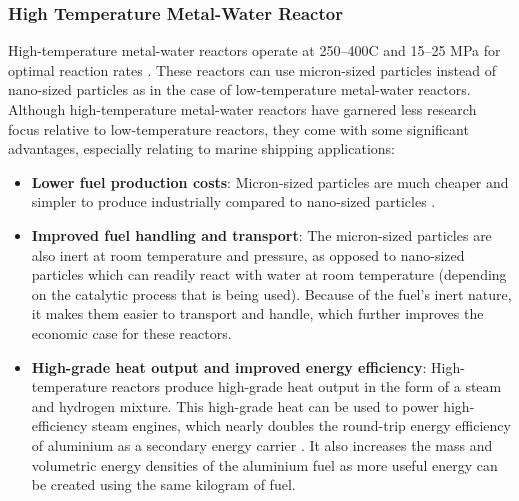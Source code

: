 \documentclass[12pt]{article}
\begin{document}
\subsubsection{High Temperature Metal-Water Reactor}

High-temperature metal-water reactors operate at 250--400\textdegree C and 15--25 MPa for optimal reaction rates \cite{high-temp-Al-H2O}. These reactors can use micron-sized particles instead of nano-sized particles as in the case of low-temperature metal-water reactors. Although high-temperature metal-water reactors have garnered less research focus relative to low-temperature reactors, they come with some significant advantages, especially relating to marine shipping applications:

\begin{itemize}
    \item \textbf{Lower fuel production costs}: Micron-sized particles are much cheaper and simpler to produce industrially compared to nano-sized particles \cite{high-temp-Al-H2O, Al-steam, metal-water-temp-JMB}.
    
    \item \textbf{Improved fuel handling and transport}: The micron-sized particles are also inert at room temperature and pressure, as opposed to nano-sized particles which can readily react with water at room temperature (depending on the catalytic process that is being used). Because of the fuel's inert nature, it makes them easier to transport and handle, which further improves the economic case for these reactors.
    
    \item \textbf{High-grade heat output and improved energy efficiency}: High-temperature reactors produce high-grade heat output in the form of a steam and hydrogen mixture. This high-grade heat can be used to power high-efficiency steam engines, which nearly doubles the round-trip energy efficiency of aluminium as a secondary energy carrier \cite{metal-water-temp-JMB}. It also increases the mass and volumetric energy densities of the aluminium fuel as more useful energy can be created using the same kilogram of fuel.
    

\end{itemize}
\end{document}
